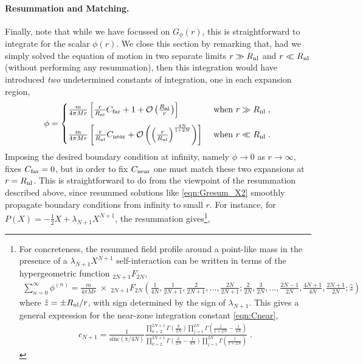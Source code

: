 \documentclass[11pt]{article}
\begin{document}
\paragraph{Resummation and Matching.}
Finally, note that while we have focussed on $G_\phi (r)$, this is straightforward to integrate for the scalar $\phi (r)$. 
We close this section by remarking that, had we simply solved the equation of motion in two separate limits $r \gg R_{\rm nl}$ and $r \ll R_{\rm nl}$ (without performing any resummation), then this integration would have introduced \emph{two} undetermined constants of integration, one in each expansion region,  
\begin{align}
\phi = \begin{cases}
\frac{m}{4 \pi M r} \left[  \frac{r}{R_{\rm nl}} C_{\rm far} + 1 + \mathcal{O} \left( \frac{R_{\rm nl}}{r}  \right) \right] &\text{ when } r \gg R_{\rm nl}  \; , \\[10pt]
\frac{m}{4 \pi M r} \left[
\frac{r}{ R_{\rm nl} }  C_{\rm near}   + \mathcal{O} \left(  \left( \frac{r}{R_{\rm nl}} \right)^{\frac{4N}{1+2N} }   \right)  \right]   &\text{ when } r \ll R_{\rm nl} \; . 
\end{cases}
\end{align}
Imposing the desired boundary condition at infinity, namely $\phi \to 0$ as $r \to \infty$, fixes $C_{\rm far} = 0$, but in order to fix $C_{\rm near}$ one must match these two expansions at $r=R_{\rm nl}$. 
This is straightforward to do from the viewpoint of the resummation described above, since resummed solutions like \eqref{eqn:Gresum_X2} smoothly propagate boundary conditions from infinity to small $r$. For instance, for $P(X) = -\tfrac{1}{2} X + \lambda_{N+1} X^{N+1}$, the resummation gives\footnote{
For concreteness, the resummed field profile around a point-like mass in the presence of a $\lambda_{N+1} X^{N+1}$ self-interaction can be written in terms of the hypergeometric function ${}_{2N+1} F_{2N}$, 
\begin{align}
\sum_{n=0}^\infty \phi^{(n)} = \tfrac{m}{4 \pi M r}\; \times \;  {}_{2N+1} F_{2N} \left( \tfrac{1}{4N} , \tfrac{1}{2N+1} , \tfrac{2}{2N+1} , ... , \tfrac{2N}{2N+1}    ; \tfrac{2}{2N} , \tfrac{3}{2N}, ... , \tfrac{2N-1}{2N} , \tfrac{4N+1}{4N}  , \tfrac{2N+1}{2N}    ; \hat{z} \right)
\label{eqn:phiresum}
\end{align}
where $\hat{z}= \pm R_{\rm nl}/r$, with sign determined by the sign of $\lambda_{N+1}$. This gives a general expression for the near-zone integration constant \eqref{eqn:Cnear},
\begin{align}
c_{N+1} = \frac{ 1 }{ \text{sinc} \left( \pi /4N \right) }   \frac{  \prod_{k=2}^{2N+1} \Gamma \left( \tfrac{k}{2N} \right)  \prod_{j=1}^{2N} \Gamma \left( \tfrac{j}{1+2N} - \tfrac{1}{4N} \right)  }{ 
\prod_{k=2}^{2N+1} \Gamma \left( \tfrac{k}{2N} - \tfrac{1}{4N} \right)  \prod_{j=1}^{2N} \Gamma \left( \tfrac{j}{1+2N}  \right) }  \; .
\label{eqn:CnearExact}
\end{align}
},
\end{document}
